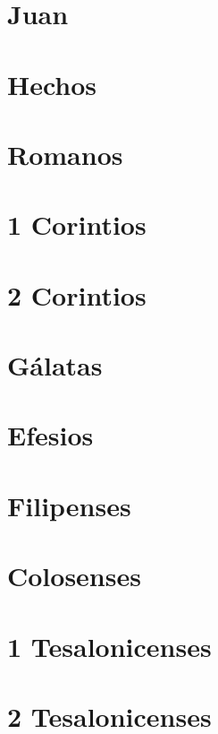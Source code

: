 \chapter{Juan}



\chapter{Hechos}



\chapter{Romanos}



\chapter{1 Corintios}



\chapter{2 Corintios}



\chapter{Gálatas}



\chapter{Efesios}



\chapter{Filipenses}



\chapter{Colosenses}



\chapter{1 Tesalonicenses}



\chapter{2 Tesalonicenses}



